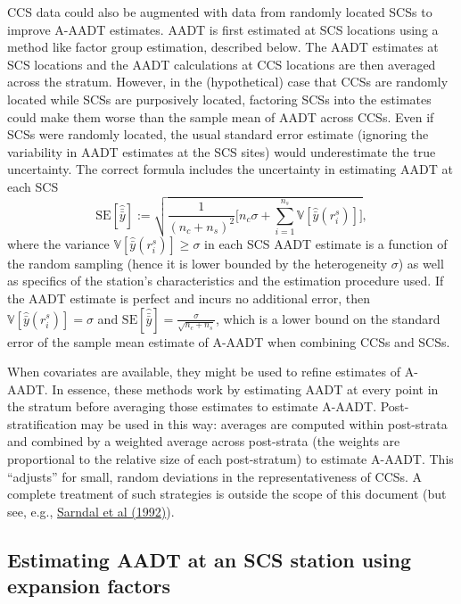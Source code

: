 \documentclass[11pt]{article}
\begin{document}
CCS data could also be augmented with data from randomly located SCSs to
improve A-AADT estimates. AADT is first estimated at SCS locations using
a method like factor group estimation, described below. The AADT
estimates at SCS locations and the AADT calculations at CCS locations
are then averaged across the stratum. However, in the (hypothetical)
case that CCSs are randomly located while SCSs are purposively located,
factoring SCSs into the estimates could make them worse than the sample
mean of AADT across CCSs. Even if SCSs were randomly located, the usual
standard error estimate (ignoring the variability in AADT estimates at
the SCS sites) would underestimate the true uncertainty. The correct
formula includes the uncertainty in estimating AADT at each SCS
\[\mbox{SE}[\hat{\bar{\bar{y}}}] := \sqrt{\frac{1}{(n_c + n_s)^2}\bigg [n_c \sigma + \sum_{i=1}^{n_s} \mathbb{V}[\hat{\bar{y}}(r_i^s)] \bigg ]},\]
where the variance \(\mathbb{V}[\hat{\bar{y}}(r_i^s)] \geq \sigma\) in
each SCS AADT estimate is a function of the random sampling (hence it is
lower bounded by the heterogeneity \(\sigma\)) as well as specifics of
the station's characteristics and the estimation procedure used. If the
AADT estimate is perfect and incurs no additional error, then
\(\mathbb{V}[\hat{\bar{y}}(r_i^s)] = \sigma\) and
\(\mbox{SE}[\hat{\bar{\bar{y}}}] = \frac{\sigma}{\sqrt{n_c + n_s}}\),
which is a lower bound on the standard error of the sample mean estimate
of A-AADT when combining CCSs and SCSs.

When covariates are available, they might be used to refine estimates of
A-AADT. In essence, these methods work by estimating AADT at every point
in the stratum before averaging those estimates to estimate A-AADT.
Post-stratification may be used in this way: averages are computed
within post-strata and combined by a weighted average across post-strata
(the weights are proportional to the relative size of each post-stratum)
to estimate A-AADT. This ``adjusts'' for small, random deviations in the
representativeness of CCSs. A complete treatment of such strategies is
outside the scope of this document (but see, e.g.,
\href{https://link.springer.com/book/9780387406206?utm_medium=referral&utm_source=google_books&utm_campaign=3_pier05_buy_print&utm_content=en_08082017}{Sarndal
et al (1992)}).

    \subsection{Estimating AADT at an SCS station using expansion
factors}\label{estimating-aadt-at-an-scs-station-using-expansion-factors}
\end{document}

